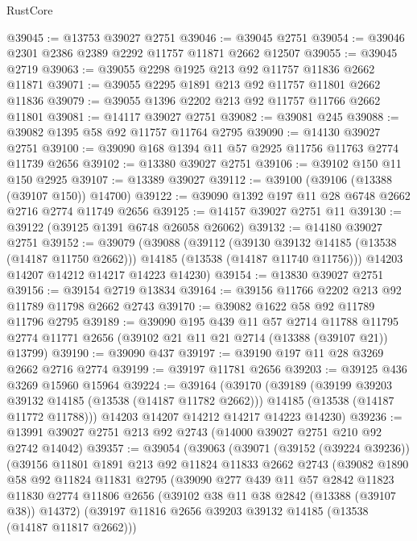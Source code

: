 \begin{lexlean}{RustCore}
\begin{coremodule}
@39045 := @13753 @39027 @2751
@39046 := @39045 @2751
@39054 := @39046 @2301 @2386 @2389 @2292 @11757 @11871 @2662 @12507
@39055 := @39045 @2719
@39063 := @39055 @2298 @1925 @213 @92 @11757 @11836 @2662 @11871
@39071 := @39055 @2295 @1891 @213 @92 @11757 @11801 @2662 @11836
@39079 := @39055 @1396 @2202 @213 @92 @11757 @11766 @2662 @11801
@39081 := @14117 @39027 @2751
@39082 := @39081 @245
@39088 := @39082 @1395 @58 @92 @11757 @11764 @2795
@39090 := @14130 @39027 @2751
@39100 := @39090 @168 @1394 @11 @57 @2925 @11756 @11763 @2774 @11739 @2656
@39102 := @13380 @39027 @2751
@39106 := @39102 @150 @11 @150 @2925
@39107 := @13389 @39027
@39112 := @39100 (@39106 (@13388 (@39107 @150)) @14700)
@39122 := @39090 @1392 @197 @11 @28 @6748 @2662 @2716 @2774 @11749 @2656
@39125 := @14157 @39027 @2751 @11
@39130 := @39122 (@39125 @1391 @6748 @26058 @26062)
@39132 := @14180 @39027 @2751
@39152 := @39079
    (@39088
      (@39112
        (@39130 @39132 @14185 (@13538 (@14187 @11750 @2662)))
        @14185
        (@13538 (@14187 @11740 @11756)))
      @14203
      @14207
      @14212
      @14217
      @14223
      @14230)
@39154 := @13830 @39027 @2751
@39156 := @39154 @2719 @13834
@39164 := @39156 @11766 @2202 @213 @92 @11789 @11798 @2662 @2743
@39170 := @39082 @1622 @58 @92 @11789 @11796 @2795
@39189 := @39090
    @195
    @439
    @11
    @57
    @2714
    @11788
    @11795
    @2774
    @11771
    @2656
    (@39102 @21 @11 @21 @2714 (@13388 (@39107 @21)) @13799)
@39190 := @39090 @437
@39197 := @39190 @197 @11 @28 @3269 @2662 @2716 @2774
@39199 := @39197 @11781 @2656
@39203 := @39125 @436 @3269 @15960 @15964
@39224 := @39164
    (@39170
      (@39189
        (@39199 @39203 @39132 @14185 (@13538 (@14187 @11782 @2662)))
        @14185
        (@13538 (@14187 @11772 @11788)))
      @14203
      @14207
      @14212
      @14217
      @14223
      @14230)
@39236 := @13991 @39027 @2751 @213 @92 @2743 (@14000 @39027 @2751 @210 @92 @2742 @14042)
@39357 := @39054
    (@39063
      (@39071
        (@39152 (@39224 @39236))
        (@39156
          @11801
          @1891
          @213
          @92
          @11824
          @11833
          @2662
          @2743
          (@39082
            @1890
            @58
            @92
            @11824
            @11831
            @2795
            (@39090
              @277
              @439
              @11
              @57
              @2842
              @11823
              @11830
              @2774
              @11806
              @2656
              (@39102 @38 @11 @38 @2842 (@13388 (@39107 @38)) @14372)
              (@39197 @11816 @2656 @39203 @39132 @14185 (@13538 (@14187 @11817 @2662)))

\end{coremodule}
\end{lexlean}
